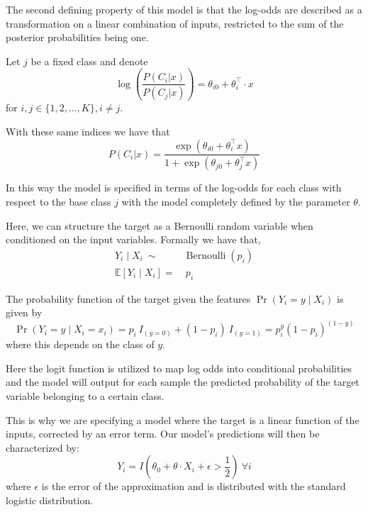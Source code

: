 
The second defining property of this model is that the log-odds are described as a transformation on a linear combination of inputs, restricted to the sum of the posterior probabilities being one.

Let $j$ be a fixed class and denote
\begin{equation}
 \log \left( \frac{P(C_i|x)}{P(C_j|x)} \right) = \theta_{i0} + \theta_i^\intercal \cdot x
 \label{logit-logOddss}
 \end{equation}
for $i,j \in \{1,2,\ldots,K\}, i \neq j$.

With these same indices we have that
\begin{equation} P(C_i|x) = \frac{\exp(\theta_{i0} + \theta_i^\intercal x)}{1 + \exp(\theta_{j0} + \theta_j^\intercal x)}
\end{equation}

In this way the model is specified in terms of the log-odds for each class with respect to the base class $j$ with the model completely defined by the parameter $\theta$.

Here, we can structure the target as a Bernoulli random variable when conditioned on the input variables.
Formally we have that,
\begin{equation}
\begin{split}
Y_i \mid X_i \ \sim & \operatorname{Bernoulli}(p_i) \\
\mathbb{E}[Y_i \mid X_i ] = & \ p_i
\end{split}
\end{equation}


The probability function of the target given the features $\Pr(Y_i=y\mid X_i)$ is given by
\begin{equation}
\Pr(Y_i=y \mid X_i = x_i) = p_i \ I_{(y=0)} + (1-p_i) \ I_{(y=1)}  = p_i^{y} {(1-p_i)}^{(1-y)}
\label{logit-probabilityDensity}
\end{equation}
where this depends on the class of $y$.

Here the logit function is utilized to map log odds into conditional probabilities and the model will output for each sample the predicted probability of the target variable belonging to a certain class.

This is why we are specifying a model where the target is a linear function of the inputs, corrected by an error term.
Our model's predictions will then be characterized by:
\begin{equation}
Y_i = I(\theta_0 + \theta \cdot X_i + \epsilon > \frac{1}{2}) \ \forall i
\label{logit-indicatorFunction}
\end{equation}
where $\epsilon$ is the error of the approximation and is distributed with the standard logistic distribution.

